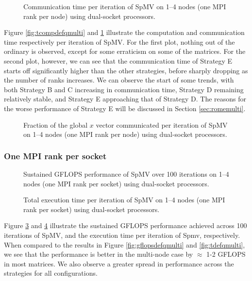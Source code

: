 \begin{figure}[H]
    \centering
    \caption{Communication time per iteration of SpMV on 1–4 nodes (one MPI rank per node) using dual-socket  processors.}
    \label{fig:tcommdefqmulti}
\end{figure}

Figure \ref{fig:tcompdefqmulti} and \ref{fig:tcommdefqmulti} illustrate the computation and communication time respectively per iteration of SpMV. For the first plot, nothing out of the ordinary is observed, except for some erraticism on some of the matrices. For the second plot, however, we can see that the communication time of Strategy E starts off significantly higher than the other strategies, before sharply dropping as the number of ranks increases. We can observe the start of some trends, with both Strategy B and C increasing in communication time, Strategy D remaining relatively stable, and Strategy E approaching that of Strategy D. The reasons for the worse performance of Strategy E will be discussed in Section \ref{sec:romemulti}.

\begin{figure}[H]
    \centering
    \caption{Fraction of the global \(x\) vector communicated per iteration of SpMV on 1–4 nodes (one MPI rank per node) using dual-socket  processors.}
    \label{fig:commloaddefqmulti}
\end{figure}

\subsubsection{One MPI rank per socket}

\begin{figure}[H]
    \centering
    \caption{Sustained GFLOPS performance of SpMV over 100 iterations on 1–4 nodes (one MPI rank per socket) using dual-socket  processors.}
    \label{fig:gflopsdefqmpimulti}
\end{figure}

\begin{figure}[H]
    \centering
    \caption{Total execution time per iteration of SpMV on 1–4 nodes (one MPI rank per socket) using dual-socket  processors.}
    \label{fig:tdefqmpimulti}
\end{figure}


Figure \ref{fig:gflopsdefqmpimulti} and \ref{fig:tdefqmpimulti} illustrate the sustained GFLOPS performance achieved across 100 iterations of SpMV, and the execution time per iteration of Spmv, respectively. When compared to the results in Figure \ref{fig:gflopsdefqmulti} and \ref{fig:tdefqmulti}, we see that the performance is better in the multi-node case by \(\approx\) 1-2 GFLOPS in most matrices. We also observe a greater spread in performance across the strategies for all configurations.

